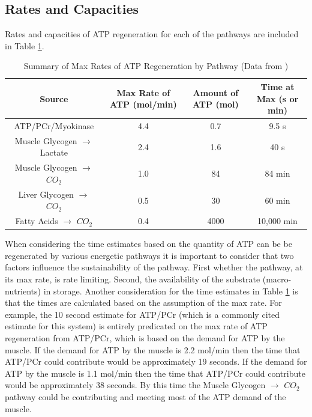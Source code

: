 \subsection{Rates and Capacities}

Rates and capacities of ATP regeneration for each of the pathways are included in Table \ref{table:ATP_Rates}.

\begin{table}[h!]
\centering
\begin{tabular}{||c c c c||} 
 \hline
Source & Max Rate of ATP (mol/min) & Amount of ATP (mol) & Time at Max (s or min)\\ [0.5ex] 
 \hline\hline
 ATP/PCr/Myokinase & 4.4  & 0.7 & 9.5 s \\
 Muscle Glycogen $\rightarrow$ Lactate &  2.4 & 1.6 & 40 s \\ 
 Muscle Glycogen $\rightarrow$ $CO_2$ & 1.0 & 84 & 84 min\\
 Liver Glycogen $\rightarrow$ $CO_2$  & 0.5 & 30 & 60 min \\ 
 Fatty Acids $\rightarrow$ $CO_2$ & 0.4 & 4000 & 10,000 min \\[1ex] 
 \hline
\end{tabular}
\caption{Summary of Max Rates of ATP Regeneration by Pathway (\footnotesize{Data from \cite{feher_quantitative_2017}})}
\label{table:ATP_Rates}
\end{table}

When considering the time estimates based on the quantity of ATP can be be regenerated by various energetic pathways it is important to consider that two factors influence the sustainability of the pathway. First whether the pathway, at its max rate, is rate limiting. Second, the availability of the substrate (macro-nutrients) in storage. Another consideration for the time estimates in Table \ref{table:ATP_Rates} is that the times are calculated based on the assumption of the max rate. For example, the 10 second estimate for ATP/PCr (which is a commonly cited estimate for this system) is entirely predicated on the max rate of ATP regeneration from ATP/PCr, which is based on the demand for ATP by the muscle. If the demand for ATP by the muscle is 2.2 mol/min then the time that ATP/PCr could contribute would be approximately 19 seconds. If the demand for ATP by the muscle is 1.1 mol/min then the time that ATP/PCr could contribute would be approximately 38 seconds. By this time the Muscle Glycogen $\rightarrow$ $CO_2$ pathway could be contributing and meeting most of the ATP demand of the muscle. 


